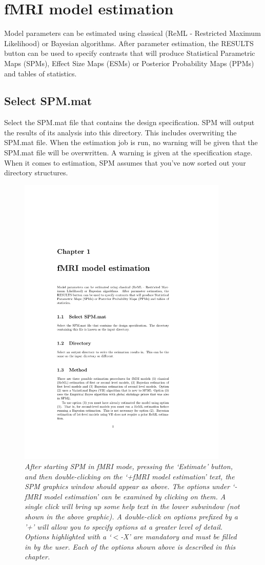 \documentclass[a4paper,titlepage]{book}
\begin{document}
\chapter{fMRI model estimation}

Model parameters can be estimated using classical (ReML - Restricted Maximum Likelihood) or Bayesian algorithms. After parameter estimation, the RESULTS button can be used to specify contrasts that will produce Statistical Parametric Maps (SPMs), Effect Size Maps (ESMs) or Posterior Probability Maps (PPMs) and tables of statistics. 

\section{Select SPM.mat}
Select the SPM.mat file that contains the design specification. 
SPM will output the results of its analysis into this directory. This includes overwriting the SPM.mat file.
When the estimation job is run, no warning will be given that the SPM.mat file will be overwritten. 
A warning is given at the specification stage. When it comes to estimation, SPM assumes that you've now sorted out your directory structures.

\begin{figure}
\includegraphics[width=100mm]{fmri_est}
\caption{\em After starting SPM in fMRI mode, pressing the `Estimate' button, and then double-clicking on the `+fMRI model estimation' text, the SPM graphics window should appear as above. The options under `-fMRI model estimation' can be examined by clicking on them. A single click will bring up some help text in the lower subwindow (not shown in the above graphic). 
A double-click on options prefixed by a '+' will allow you to specify 
options at a greater level of detail. Options highlighted with a `$<$-X' are mandatory and must be filled in by the user. Each of the options shown above is described in this chapter. \label{est}}
\end{figure}
\end{document}
